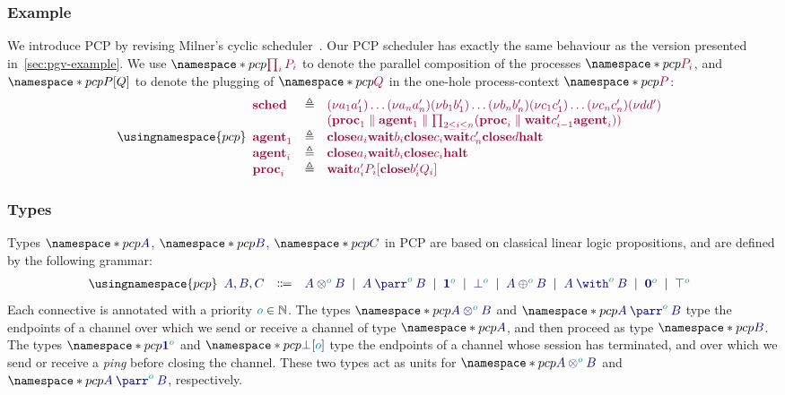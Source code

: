 \documentclass[main.tex]{subfiles}
\begin{document}
\subsubsection*{Example}\label{sec:pcp-example}
We introduce PCP by revising Milner's cyclic scheduler~\cite{milner89,dardhagay18}. Our PCP scheduler has exactly the same behaviour as the version presented in~\cref{sec:pgv-example}. We use $\pcp{\tm{\prod_{i}P_i}}$ to denote the parallel composition of the processes $\pcp{\tm{P_i}}$, and $\pcp{\plug{P}{Q}}$ to denote the plugging of $\pcp{\tm{Q}}$ in the one-hole process-context $\pcp{\tm{P}}$:
\[
  \usingnamespace{pcp}
  \begin{array}{lrlr}
    \tm{\sched}
    & \defeq & \tm{\res{a_1}{a'_1}{\dots{\res{a_n}{a'_n}{}}}}
               \tm{\res{b_1}{b'_1}{\dots{\res{b_n}{b'_n}{}}}}
               \tm{\res{c_1}{c'_1}{\dots{\res{c_n}{c'_n}{}}}}
               \tm{\res{d}{d'}{}}
    \\ &     & \tm{(
               \ppar{\proc1}{\agent1}
               \parallel
               \prod_{2\leq{i}\leq{n}}(\ppar{\proc{i}}{\wait{c'_{i-1}}{\agent{i}}})
               )}
    \\
    \tm{\agent1}
    & \defeq & \tm{\close{a_i}{\wait{b_i}{\close{c_i}{\wait{c'_n}{\close{d}{\halt}}}}}}
    \\
    \tm{\agent{i}}
    & \defeq & \tm{\close{a_i}{\wait{b_i}{\close{c_i}{\halt}}}}
    \\
    \tm{\proc{i}}
    & \defeq & \tm{\wait{a'_i}{\plug{P_i}{\close{b'_i}{Q_i}}}}
  \end{array}
\]

\subsubsection*{Types}
Types $\pcp{\ty{A}}$, $\pcp{\ty{B}}$, $\pcp{\ty{C}}$ in PCP are based on classical linear logic propositions, and are defined by the following grammar:
\[
  \usingnamespace{pcp}
  \begin{array}{lcl}
    \ty{A}, \ty{B}, \ty{C}
    & \Coloneqq & \ty{\tytens[\cs{o}]{A}{B}}
      \sep        \ty{\typarr[\cs{o}]{A}{B}}
      \sep        \ty{\tyone[\cs{o}]}
      \sep        \ty{\tybot[\cs{o}]}
      \sep        \ty{\typlus[\cs{o}]{A}{B}}
      \sep        \ty{\tywith[\cs{o}]{A}{B}}
      \sep        \ty{\tynil[\cs{o}]}
      \sep        \ty{\tytop[\cs{o}]}
  \end{array}
\]
Each connective is annotated with a priority $\cs{o}\in\mathbb{N}$.
The types $\pcp{\ty{\tytens[\cs{o}]{A}{B}}}$ and $\pcp{\ty{\typarr[\cs{o}]{A}{B}}}$ type the endpoints of a channel over which we send or receive a channel of type $\pcp{\ty{A}}$, and then proceed as type $\pcp{\ty{B}}$. The types $\pcp{\ty{\tyone[\cs{o}]}}$ and $\pcp{\ty{{\tybot}[\cs{o}]}}$ type the endpoints of a channel whose session has terminated, and over which we send or receive a \emph{ping} before closing the channel. These two types act as units for $\pcp{\ty{\tytens[\cs{o}]{A}{B}}}$ and $\pcp{\ty{\typarr[\cs{o}]{A}{B}}}$, respectively.
\end{document}
